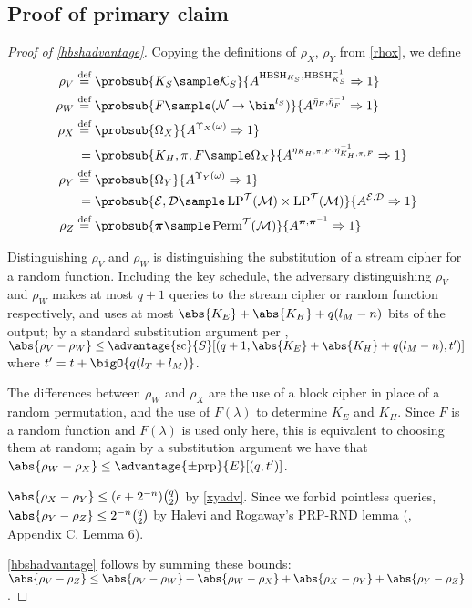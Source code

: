 \documentclass[eprint.tex]{subfiles}
\begin{document}
\subsection{Proof of primary claim}
\begin{proof}[Proof of \autoref{hbshadvantage}]\label{hbshproof}
    Copying the definitions of $\rho_X$, $\rho_Y$ from \autoref{rhox},
    we define
    \begin{align*}
        \rho_V \defeq{}& \probsub{K_S \sample \mathcal{K}_S}
            {A^{\HBSH_{K_S}, \HBSH_{K_S}^{-1}}\Rightarrow 1} \\
        \rho_W \defeq{}& \probsub{F \sample (\mathcal{N} \rightarrow \bin^{l_S})}
            {A^{\bar{\eta}_{F}, \bar{\eta}_{F}^{-1}}\Rightarrow 1} \\
        \rho_X \defeq{}& \probsub{\Omega_X}{A^{\Upsilon_X(\omega)} \Rightarrow 1} \\
            ={}&\probsub{K_H, \pi, F \sample \Omega_X}{A^{\eta_{K_H, \pi, F}, \eta_{K_H, \pi, F}^{-1}} \Rightarrow 1} \\
        \rho_Y \defeq{}& \probsub{\Omega_Y}{A^{\Upsilon_Y(\omega)} \Rightarrow 1} \\
            ={}&\probsub{\mathcal{E}, \mathcal{D} \sample \LP^\mathcal{T}(\mathcal{M}) \times \LP^\mathcal{T}(\mathcal{M})}{A^{\mathcal{E}, \mathcal{D}} \Rightarrow 1} \\
        \rho_Z \defeq{}& \probsub{\bm{\pi} \sample \Perm^\mathcal{T}(\mathcal{M})}
            {A^{\bm{\pi},\bm{\pi}^{-1}}\Rightarrow 1} \\
    \end{align*}

    Distinguishing
    $\rho_V$ and $\rho_W$ is distinguishing the substitution of a stream cipher
    for a random function.
    Including the key schedule, the adversary distinguishing
    $\rho_V$ and $\rho_W$ makes at most $q + 1$ queries to the stream cipher
    or random function respectively, and uses at most $\abs{K_E} + \abs{K_H} + q(l_M - n)$ bits
    of the output; by a standard substitution argument per \cite{cbcsec,concsym},
    $\abs{\rho_V - \rho_W} \leq
    \advantage{\mathrm{sc}}{S}[(q + 1, \abs{K_E} + \abs{K_H} + q(l_M - n), t')]$
    where $t' = t + \bigO{q(l_T + l_M)}$.

    The differences between $\rho_W$ and $\rho_X$ are the use of a block cipher
    in place of a random permutation, and the use of $F(\lambda)$ to determine
    $K_E$ and $K_H$. Since $F$ is a random function and $F(\lambda)$ is used
    only here, this is equivalent to choosing them at random; again by a substitution
    argument we have that $\abs{\rho_W - \rho_X} \leq \advantage{\pm \mathrm{prp}}{E}[(q, t')]$.

    $\abs{\rho_X - \rho_Y} \leq (\epsilon + 2^{-n})\binom{q}{2}$ by \autoref{xyadv}.
    Since we forbid pointless queries,
    $\abs{\rho_Y - \rho_Z} \leq 2^{-n}\binom{q}{2}$ by Halevi and Rogaway's PRP-RND lemma
    (\cite{cmc}, Appendix C, Lemma 6).

    \autoref{hbshadvantage} follows by summing these bounds:
    $\abs{\rho_V - \rho_Z} \leq
    \abs{\rho_V - \rho_W} + \abs{\rho_W - \rho_X} + \abs{\rho_X - \rho_Y} + \abs{\rho_Y - \rho_Z}$.
\end{proof}

\subbib
\end{document}
